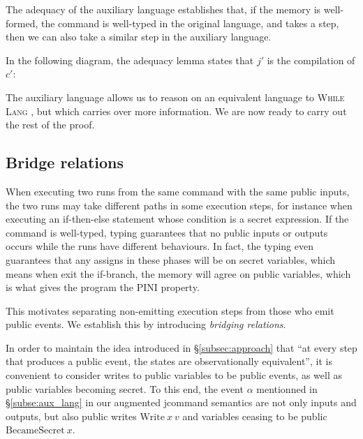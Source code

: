 \documentclass[10pt]{article}
\newcommand{\whilelang}{\textsc{While Lang} }
\newcommand{\compile}[1]{#1\!\downarrow\ }
\begin{document}
The adequacy of the auxiliary language establishes that, if the memory is well-formed, the
command is well-typed in the original language, and takes a step, then we can also take a similar
step in the auxiliary language.

In the following diagram, the adequacy lemma states that $j'$ is the compilation of $c'$:

\begin{center}
\end{center}

The auxiliary language allows us to reason on an equivalent language to \whilelang, but which
carries over more information. We are now ready to carry out the rest of the proof.

\subsection{Bridge relations}%
\label{subsec:bridge_rel}

When executing two runs from the same command with the same public inputs, the two runs may take different paths in some execution steps, for instance when executing an if-then-else statement whose condition is a secret expression. If the command is well-typed, typing guarantees that no public inputs or outputs occurs while the runs have different behaviours. In fact, the typing even guarantees that any assigns in these phases will be on secret variables, which means when exit the if-branch, the memory will agree on public variables, which is what gives the program the PINI property.

This motivates separating non-emitting execution steps from those who emit public events.
We establish this by introducing \emph{bridging relations}.

In order to maintain the idea introduced in \S\ref{subsec:approach} that ``at every step that produces a public event, the states are observationally equivalent'', it is convenient to consider writes to public variables to be public events, as well as public variables becoming secret. To this end, the event \( \alpha \) mentionned in \S\ref{subse:aux_lang} in our augmented jcommand semantics are not only inputs and outputs, but also public writes \( \mathrm{Write}~x~v \) and variables ceasing to be public \( \mathrm{BecameSecret}~x \).
\end{document}
